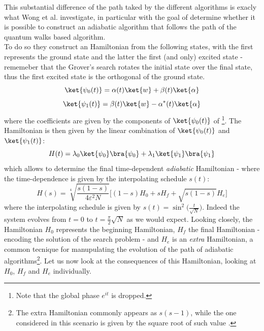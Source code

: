 \noindent
This substantial difference of the path taked by the different algorithms is exacly what Wong et al. investigate, in particular with the goal of determine whether it is possible to construct an adiabatic algorithm that follows the path of the quantum walks based algorithm. \\

\noindent
To do so they construct an Hamiltonian from the following states, with the first represents the ground state and the latter the first (and only) excited state - rememeber that the Grover's search rotates the initial state over the final state, thus the first excited state is the orthogonal of the ground state.
\begin{equation}
  \ket{\psi_0(t)} = \alpha(t)\ket{w} + \beta(t)\ket{\alpha}
\end{equation}
\vspace{-0.5cm}
\begin{equation}
  \ket{\psi_1(t)} = \beta(t)\ket{w} - \alpha^*(t)\ket{\alpha}
\end{equation}
where the coefficients are given by the components of $\ket{\psi_0(t)}$ of  \footnote{Note that the global phase $e^{it}$ is dropped.}.
The Hamiltonian is then given by the linear combination of $\ket{\psi_0(t)}$ and $\ket{\psi_1(t)}$:
\begin{equation}
  H(t) = \lambda_0\ket{\psi_0}\bra{\psi_0} + \lambda_1\ket{\psi_1}\bra{\psi_1}
\end{equation}
which allows to determine the final time-dependent \textit{adiabatic} Hamiltonian - where the time-dependence is given by the interpolating schedule $s(t)$:
\begin{equation}
  H(s) = \sqrt[4]{\frac{s(1-s)}{4\varepsilon^2N}}\Big[ (1-s)H_0 + sH_f + \sqrt{s(1-s)}H_e\Big]
\end{equation}
where the interpolating schedule is given by $s(t)=\sin^2\big(\frac{t}{\sqrt{N}}\big)$. Indeed the system evolves from $t=0$ to $t=\frac{\pi}{2}\sqrt{N}$ as we would expect. Looking closely, the Hamiltonian $H_0$ represents the beginning Hamiltonian, $H_f$ the final Hamiltonian - encoding the solution of the search problem - and $H_e$ is an \textit{extra} Hamiltonian, a common tecnique for manupulating the evolution of the path of adiabatic algorithms\footnote{The extra Hamiltonian commonly appears as $s(s-1)$, while the one considered in this scenario is given by the square root of such value \cite{Wong2016}.}. Let us now look at the consequences of this Hamiltonian, looking at $H_0$, $H_f$ and $H_e$ individually. \\
